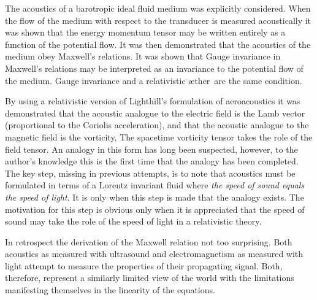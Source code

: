 \documentclass[10pt, fleqn,final,showtrims,oldfontcommands, article,a4paper,oneside]{memoir} %
\newcommand{\aether}{\ae ther}
\newcommand{\Poincare}{Poincar{\'e}}
\begin{document}
The acoustics of a  barotropic ideal fluid  medium was explicitly considered.
When the flow of the medium with respect to the transducer  is measured acoustically
it was shown that the energy momentum tensor may be written entirely as a function of the  potential flow.
It was then demonstrated that the acoustics of the medium obey Maxwell's relations.
It was shown that Gauge invariance in Maxwell's relations may be interpreted as an invariance to the  potential flow of the medium.
Gauge invariance and a relativistic \aether\ are the same condition.

By using a relativistic version of Lighthill's formulation of aeroacoustics it was demonstrated 
that the acoustic analogue to the electric field is the Lamb vector (proportional to the Coriolis acceleration),
and that the acoustic analogue to the magnetic field is the vorticity,
The spacetime vorticity tensor takes the role of the field tensor.
An analogy in this form has long been suspected\cite{Marmanis2000,Sridhar1998},
 however, to the author's knowledge this is the first time that the analogy has been  completed.
 The key step, missing in previous attempts, 
 is to note that acoustics must be formulated in terms of a Lorentz invariant fluid where
 {\em the speed of sound equals the speed of light}.
 It is only when this step is made that the analogy exists.
The motivation for this step is obvious only when it is appreciated that the speed of sound
may take the role of the speed of light in a relativistic theory.



In retrospect the derivation of the Maxwell relation not too surprising.
Both acoustics as measured with ultrasound and electromagnetism as measured with light 
attempt to measure the properties of their propagating signal.
Both, therefore, 
represent a similarly limited view of the world with
the limitations manifesting themselves in the linearity of the equations.




\end{document}
